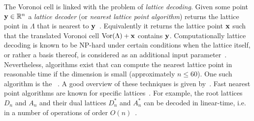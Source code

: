 \documentclass[draftcls, onecolumn, 11pt]{IEEEtran}
\begin{document}
The Voronoi cell is linked with the problem of \emph{lattice decoding}.  Given some point $\mathbf{y} \in {\mathbb R}^n$ a \emph{lattice decoder} (or \emph{nearest lattice point algorithm}) returns the lattice point in $\Lambda$ that is nearest to $\mathbf{y}$~\cite{Agrell2002}.  Equivalently it returns the lattice point $\mathbf{x}$ such that the translated Voronoi cell $\operatorname{Vor}(\Lambda) + \mathbf{x}$ contains $\mathbf{y}$.  Computationally lattice decoding is known to be NP-hard under certain conditions when the lattice itself, or rather a basis thereof, is considered as an additional input parameter~\cite{micciancio_hardness_2001, Jalden2005_sphere_decoding_complexity}. Nevertheless, algorithms exist that can compute the nearest lattice point in reasonable time if the dimension is small (approximately $n \leq 60$). One such algorithm is the ~\cite{Viterbo_sphere_decoder_1999,Pohst_sphere_decoder_1981,Agrell2002}.
A good overview of these techniques is given by~\cite{Agrell2002}. Fast nearest point algorithms are known for specific lattices~\cite{Conway1982FastQuantDec, McKilliam2008,McKilliam2009CoxeterLattices,Vardy1993_leech_lattice_MLD}. For example, the root lattices $D_n$ and $A_n$ and their dual lattices $D_n^*$ and $A_n^*$ can be decoded in linear-time, i.e. in a number of operations of order $O(n)$~\cite{Conway1982FastQuantDec,McKilliam2009CoxeterLattices}.

\end{document}
